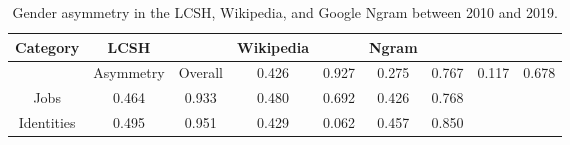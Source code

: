 \begin{table}
	\caption{Gender asymmetry in the LCSH, Wikipedia, and Google Ngram between 2010 and 2019.}
	\begin{center}
		\begin{tabular}{ccccccc}
			\toprule
			Category & LCSH &  & Wikipedia &  & Ngram &  \\
			\midrule
			 & Asymmetry & %
			Overall & 0.426 & 0.927 & 0.275 & 0.767 & 0.117 & 0.678 \\
			Jobs & 0.464 & 0.933 & 0.480 & 0.692 & 0.426 & 0.768 \\
			Identities & 0.495 & 0.951 & 0.429 & 0.062 & 0.457 & 0.850 \\
			\bottomrule
		\end{tabular}
	\end{center}
	\label{tab:asymmetry}
\end{table}